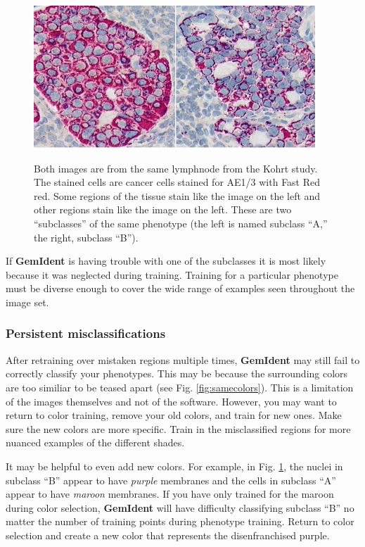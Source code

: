 \documentclass[12pt]{article}
\begin{document}
\begin{figure}[htp]
\centering
\includegraphics[width=300pt,height=153pt]{subclasses.jpg}
\label{fig:subclasses}
\caption{\sf Both images are from the same lymphnode from the Kohrt study\cite{kohrt}. The stained cells are cancer cells stained for AE1/3 with Fast Red red. Some regions of the tissue stain like the image on the left and other regions stain like the image on the left. These are two ``subclasses'' of the same phenotype (the left is named subclass ``A,'' the right, subclass ``B'').}
\end{figure}

If {\bf GemIdent} is having trouble with one of the subclasses it is most likely because it was neglected during training. Training for a particular phenotype must be diverse enough to cover the wide range of examples seen throughout the image set.

\subsubsection{Persistent misclassifications}

After retraining over mistaken regions multiple times, {\bf GemIdent} may still fail to correctly classify your phenotypes. This may be because the surrounding colors are too similiar to be teased apart (see Fig. \ref{fig:samecolors}). This is a limitation of the images themselves and not of the software. However, you may want to return to color training, remove your old colors, and train for new ones. Make sure the new colors are more specific. Train in the misclassified regions for more nuanced examples of the different shades. 

It may be helpful to even add new colors. For example, in Fig. \ref{fig:subclasses}, the nuclei in subclass ``B'' appear to have {\emph{purple}} membranes and the cells in subclass ``A'' appear to have {\emph{maroon}} membranes. If you have only trained for the maroon during color selection, {\bf GemIdent} will have difficulty classifying subclass ``B'' no matter the number of training points during phenotype training. Return to color selection and create a new color that represents the disenfranchised purple.
\end{document}
